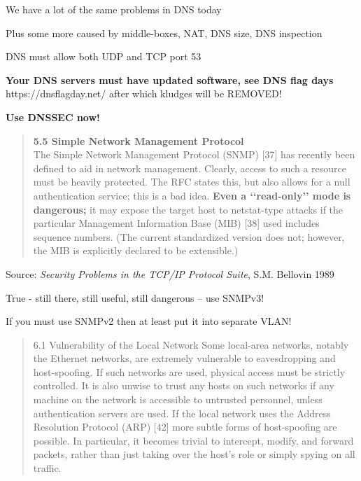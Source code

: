 \documentclass[Screen16to9,17pt]{foils}
\begin{document}
\begin{list1}
\item We have a lot of the same problems in DNS today
\item Plus some more caused by middle-boxes, NAT, DNS size, DNS inspection
\begin{list2}
\item DNS must allow both UDP and TCP port 53
\item {\bf Your DNS servers must have updated software, see DNS flag days}\\ https://dnsflagday.net/ after which kludges will be REMOVED!
\item {\bf Use DNSSEC now!}
\end{list2}
\end{list1}


\begin{quote}
{\bf 5.5 Simple Network Management Protocol}\\
The Simple Network Management Protocol (SNMP) [37] has recently been defined to aid in network management. Clearly, access to such a resource must be heavily protected. The RFC states this, but also allows for a null authentication service; this is a bad idea. {\bf Even a ‘‘read-only’’ mode is dangerous;} it may expose the target host to netstat-type attacks if the particular Management Information Base (MIB) [38] used includes sequence numbers. (The current standardized version does not; however, the MIB is explicitly declared to be extensible.)
\end{quote}
Source: \emph{Security Problems in the TCP/IP Protocol Suite}, S.M. Bellovin 1989\\

True - still there, still useful, still dangerous -- use SNMPv3!

If you must use SNMPv2 then at least put it into separate VLAN! {\myalert}


\begin{quote}
6.1 Vulnerability of the Local Network
Some local-area networks, notably the Ethernet networks, are extremely vulnerable to eavesdropping and
host-spoofing. If such networks are used, physical access must be strictly controlled. It is also unwise
to trust any hosts on such networks if any machine on the network is accessible to untrusted personnel,
unless authentication servers are used.
If the local network uses the Address Resolution Protocol (ARP) [42] more subtle forms of host-spoofing
are possible. In particular, it becomes trivial to intercept, modify, and forward packets, rather than just
taking over the host’s role or simply spying on all traffic.
\end{quote}
\end{document}
